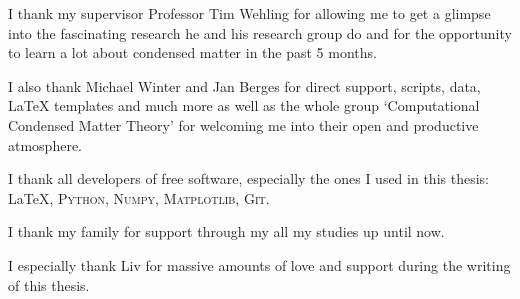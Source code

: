 \documentclass[../main.tex]{subfiles}
\begin{document}
I thank my supervisor Professor Tim Wehling for allowing me to get a glimpse into the fascinating research he and his research group do and for the opportunity to learn a lot about condensed matter in the past 5 months.

I also thank Michael Winter and Jan Berges for direct support, scripts, data, \LaTeX{} templates and much more as well as the whole group `Computational Condensed Matter Theory' for welcoming me into their open and  productive atmosphere.

I thank all developers of free software, especially the ones I used in this thesis: \LaTeX, \textsc{Python}, \textsc{Numpy}, \textsc{Matplotlib}, \textsc{Git}.

I thank my family for support through my all my studies up until now.

I especially thank Liv for massive amounts of love and support during the writing of this thesis.
\end{document}
